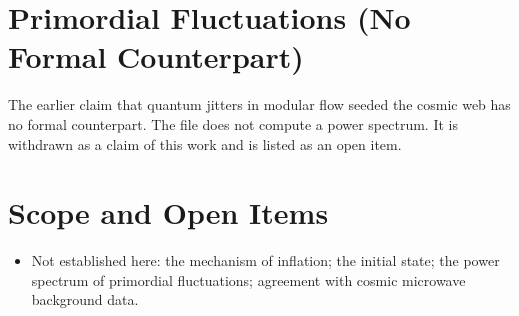 \documentclass[11pt, a4paper]{article}
\begin{document}
\section{Primordial Fluctuations (No Formal Counterpart)}
The earlier claim that quantum jitters in modular flow seeded the cosmic web has no formal counterpart. The file does not compute a power spectrum. It is withdrawn as a claim of this work and is listed as an open item.

\section{Scope and Open Items}
\begin{itemize}
  \item Not established here: the mechanism of inflation; the initial state; the power spectrum of primordial fluctuations; agreement with cosmic microwave background data.
\end{itemize}
\end{document}

